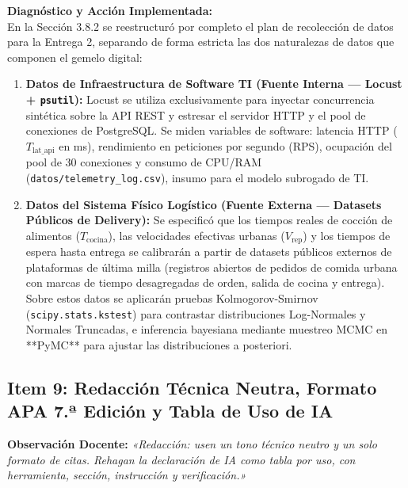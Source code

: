\documentclass[11pt,letterpaper]{article}
\begin{document}
\vspace{0.4em}
\noindent \textbf{Diagnóstico y Acción Implementada:} \\
En la Sección 3.8.2 se reestructuró por completo el plan de recolección de datos para la Entrega 2, separando de forma estricta las dos naturalezas de datos que componen el gemelo digital:
\begin{enumerate}[leftmargin=1.5em, itemsep=0.2em]
    \item \textbf{Datos de Infraestructura de Software TI (Fuente Interna — Locust + \texttt{psutil}):}
    Locust se utiliza exclusivamente para inyectar concurrencia sintética sobre la API REST y estresar el servidor HTTP y el pool de conexiones de PostgreSQL. Se miden variables de software: latencia HTTP ($T_{\text{lat\_api}}$ en ms), rendimiento en peticiones por segundo (RPS), ocupación del pool de 30 conexiones y consumo de CPU/RAM (\texttt{datos/telemetry\_log.csv}), insumo para el modelo subrogado de TI.
    \item \textbf{Datos del Sistema Físico Logístico (Fuente Externa — Datasets Públicos de Delivery):}
    Se especificó que los tiempos reales de cocción de alimentos ($T_{\text{cocina}}$), las velocidades efectivas urbanas ($V_{\text{rep}}$) y los tiempos de espera hasta entrega se calibrarán a partir de datasets públicos externos de plataformas de última milla (registros abiertos de pedidos de comida urbana con marcas de tiempo desagregadas de orden, salida de cocina y entrega). Sobre estos datos se aplicarán pruebas Kolmogorov-Smirnov (\texttt{scipy.stats.kstest}) para contrastar distribuciones Log-Normales y Normales Truncadas, e inferencia bayesiana mediante muestreo MCMC en **PyMC** para ajustar las distribuciones a posteriori.
\end{enumerate}

\subsection{Item 9: Redacción Técnica Neutra, Formato APA 7.ª Edición y Tabla de Uso de IA}
\noindent \textbf{Observación Docente:} \textit{«Redacción: usen un tono técnico neutro y un solo formato de citas. Rehagan la declaración de IA como tabla por uso, con herramienta, sección, instrucción y verificación.»}
\end{document}
